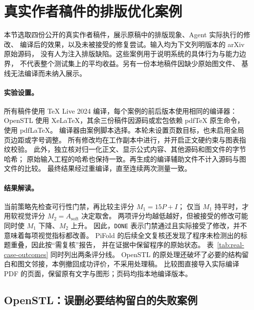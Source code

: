 \providecommand{\texoptCaseAssetPath}{case_studies/figures/}
\providecommand{\texoptCaseBreak}{}

\section{真实作者稿件的排版优化案例}
\label{app:real-manuscript-cases}

本节选取四份公开的真实作者稿件，展示原稿中的排版现象、Agent 实际执行的修改、
编译后的效果，以及未被接受的修复尝试。输入均为下文列明版本的 arXiv 原始源码，
没有人为注入排版缺陷。这些案例用于说明系统的具体行为与能力边界，
不代表整个测试集上的平均收益。另有一份本地稿件因缺少原始图文件、
基线无法编译而未纳入展示。

\paragraph{实验设置。}
所有稿件使用 TeX Live 2024 编译，每个案例的前后版本使用相同的编译器：
OpenSTL 使用 XeLaTeX，其余三份稿件因源码或宏包依赖 pdfTeX 原生命令，使用 pdfLaTeX。
编译器由案例脚本选择。本轮未设置页数目标，也未启用全局页边距或字号调整。
所有修改均在工作副本中进行，并开启正文硬约束与图表指纹校验。
此外，独立核对归一化正文、显示公式内容、其他源码和图文件的字节哈希；
原始输入工程的哈希也保持一致。再生成的编译辅助文件不计入源码与图文件的比较。
最终结果经过重编译，直至连续两次测量一致。

\paragraph{结果解读。}
当前策略先检查可行性门禁，再比较主评分 $M_1=15P+I$；
仅当 $M_1$ 持平时，才用软视觉评分 $M_2=A_{\mathrm{soft}}$ 决定取舍。
两项评分均越低越好，但被接受的修改可能同时使 $M_1$ 下降、$M_2$ 上升。
因此，\texttt{DONE} 表示门禁通过且实际接受了修改，并不意味着每项视觉指标都改善。
PiFold 的后续全文复核还发现了程序未检测出的标题重叠，因此按“需复核”报告，
并在证据中保留程序的原始状态。
表~\ref{tab:real-case-outcomes} 同时列出两条评分线。
OpenSTL 的原处理还破坏了必要的结构留白和图文邻接，本例撤回成功评价，不采用处理稿。
比较图直接导入实际编译 PDF 的页面，保留原有文字与图形；页码均指本地编译版本。



\texoptCaseBreak
\subsection{OpenSTL：误删必要结构留白的失败案例}
\label{app:case-openstl}


